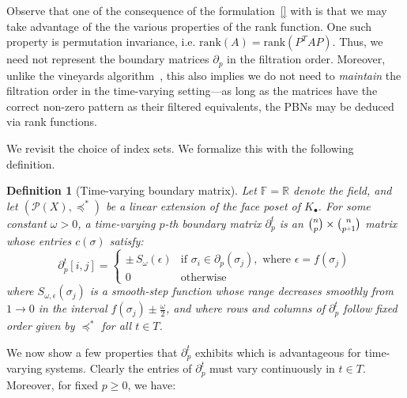 \documentclass[10pt]{article}
\newcommand{\+}{%
	\raisebox{0.18ex}{\scaleobj{0.55}{+}}
}
\newtheorem{definition}{Definition}
\begin{document}
Observe that one of the consequence of the formulation~\ref{} with is that we may take advantage of the the various properties of the rank function. One such property is permutation invariance, i.e. $\mathrm{rank}(A) = \mathrm{rank}(P^T A P)$. Thus, we need not represent the boundary matrices $\partial_p$ in the filtration order. 
Moreover, unlike the vineyards algorithm~\cite{}, this also implies we do not need to \emph{maintain} the filtration order in the time-varying setting---as long as the matrices have the correct non-zero pattern as their filtered equivalents, the PBNs may be deduced via rank functions. 

We revisit the choice of index sets. 
We formalize this with the following definition.  

\begin{definition}[Time-varying boundary matrix]\label{def:time_boundary_matrix}
Let $\mathbb{F} = \mathbb{R}$ denote the field, and let $(\mathcal{P}(X), \preceq^\ast)$ be a linear extension of the face poset of $K_\bullet$. For some constant $\omega > 0$, a time-varying $p$-th boundary matrix $\partial_p^t$ is an $\binom{n}{p} \times \binom{n}{p\+1}$ matrix whose entries $c(\sigma)$ satisfy:
$$
\partial_p^t[i,j] = \begin{cases}
	\pm \, S_{\omega}(\epsilon) & \text{if } \sigma_i \in \partial_p(\sigma_j), \text{ where } \epsilon = f(\sigma_j) \\
	0 & \text{otherwise}
\end{cases} 
$$
where $S_{\omega, \epsilon}(\sigma_j)$ is a \emph{smooth-step} function whose range decreases smoothly from $1 \to 0$ in the interval $f(\sigma_j) \pm \frac{\omega}{2}$, and where rows and columns of $\partial_p^t$ follow fixed order given by $\preceq^\ast$ for all $t \in T$.%
\end{definition}
\noindent
We now show a few properties that $\partial_p^t$ exhibits which is advantageous for time-varying systems. Clearly the entries of $\partial_p^t$ must vary continuously in $t \in T$. Moreover, for fixed $p \geq 0$, we have:
% 
\end{document}
